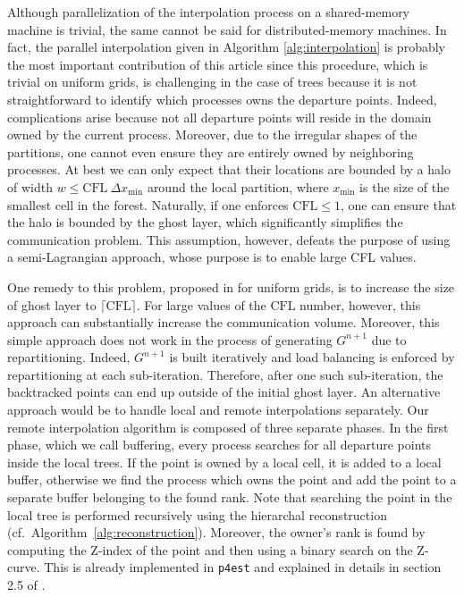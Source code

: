 Although parallelization of the interpolation process on a shared-memory
machine is trivial, the same cannot be said for distributed-memory machines.
In fact, the parallel interpolation given in Algorithm \ref{alg:interpolation}
is probably the most important contribution of this article since this
procedure, which is trivial on uniform grids, is challenging in the case of
trees because it is not straightforward to identify which processes owns the
departure points.
Indeed, complications arise because not all departure points will reside in the
domain owned by the current process. Moreover, due to the irregular shapes of
the partitions, one cannot even ensure they are entirely owned by neighboring
processes.
At best we can only expect that their locations are bounded by a halo of width
$w \le \text{CFL} \: \Delta x_{\min}$ around the local partition, where
$x_{\min}$ is the size of the smallest cell in the forest.
Naturally, if one enforces $\text{CFL} \le 1$, one can ensure that the halo is
bounded by the ghost layer, which significantly simplifies the communication
problem.
This assumption, however, defeats the purpose of using a semi-Lagrangian
approach, whose purpose is to enable large CFL values.

One remedy to this problem, proposed in \cite{Thomas;Cote:95:Massively-parallel-s} for uniform grids, is to increase the size of ghost layer to $\lceil \text{CFL} \rceil$. For large values of the $\text{CFL}$ number, however, this approach can substantially increase the communication volume. Moreover, this simple approach does not work in the process of generating $G^{n+1}$ due to repartitioning. Indeed, $G^{n+1}$ is built iteratively and load balancing is enforced by repartitioning at each sub-iteration. Therefore, after one such sub-iteration, the backtracked points can end up outside of the initial ghost layer. An alternative approach would be to handle local and remote interpolations separately. Our remote interpolation algorithm is composed of three separate phases. In the first phase, which we call buffering, every process searches for all departure points inside the local trees. If the point is owned by a local cell, it is added to a local buffer, otherwise we find the process which owns the point and add the point to a separate buffer belonging to the found rank. Note that searching the point in the local tree is performed recursively using the hierarchal reconstruction (cf.\ Algorithm~\ref{alg:reconstruction}). Moreover, the owner's rank is found by computing the Z-index of the point and then using a binary search on the Z-curve. This is already implemented in \texttt{p4est} and explained in details in section 2.5 of \cite{Burstedde;Wilcox;Ghattas:11:p4est:-Scalable-Algo}.


